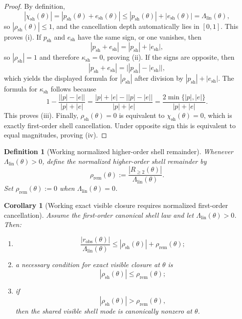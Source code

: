 \documentclass[12pt,a4paper]{article}
\newtheorem{corollary}[theorem]{Corollary}
\newtheorem{definition}[theorem]{Definition}
\begin{document}
\begin{proof}
By definition,
\[
 |\chi_{\mathrm{sh}}(\theta)|=|p_{\mathrm{sh}}(\theta)+e_{\mathrm{sh}}(\theta)|
 \le |p_{\mathrm{sh}}(\theta)|+|e_{\mathrm{sh}}(\theta)|
 =\Lambda_{\mathrm{lin}}(\theta),
\]
so $|\rho_{\mathrm{sh}}(\theta)|\le 1$, and the cancellation depth automatically lies in $[0,1]$. This proves (i). If $p_{\mathrm{sh}}$ and $e_{\mathrm{sh}}$ have the same sign, or one vanishes, then
\[
 |p_{\mathrm{sh}}+e_{\mathrm{sh}}|=|p_{\mathrm{sh}}|+|e_{\mathrm{sh}}|,
\]
so $|\rho_{\mathrm{sh}}|=1$ and therefore $\kappa_{\mathrm{sh}}=0$, proving (ii). If the signs are opposite, then
\[
 |p_{\mathrm{sh}}+e_{\mathrm{sh}}|=\bigl||p_{\mathrm{sh}}|-|e_{\mathrm{sh}}|\bigr|,
\]
which yields the displayed formula for $|\rho_{\mathrm{sh}}|$ after division by $|p_{\mathrm{sh}}|+|e_{\mathrm{sh}}|$. The formula for $\kappa_{\mathrm{sh}}$ follows because
\[
 1-\frac{\bigl||p|-|e|\bigr|}{|p|+|e|}=\frac{|p|+|e|-\bigl||p|-|e|\bigr|}{|p|+|e|}=\frac{2\min\{|p|,|e|\}}{|p|+|e|}.
\]
This proves (iii). Finally, $\rho_{\mathrm{sh}}(\theta)=0$ is equivalent to $\chi_{\mathrm{sh}}(\theta)=0$, which is exactly first-order shell cancellation. Under opposite sign this is equivalent to equal magnitudes, proving (iv).
\end{proof}

\begin{definition}[Working normalized higher-order shell remainder]
Whenever $\Lambda_{\mathrm{lin}}(\theta)>0$, define the normalized higher-order shell remainder by
\[
 \rho_{\mathrm{rem}}(\theta):=\frac{|R_{\ge 2}(\theta)|}{\Lambda_{\mathrm{lin}}(\theta)}.
\]
Set $\rho_{\mathrm{rem}}(\theta):=0$ when $\Lambda_{\mathrm{lin}}(\theta)=0$.
\end{definition}

\begin{corollary}[Working exact visible closure requires normalized first-order cancellation]
Assume the first-order canonical shell law and let $\Lambda_{\mathrm{lin}}(\theta)>0$. Then:
\begin{enumerate}[leftmargin=2em,label=(\roman*)]
\item
\[
 \frac{|r_{\mathrm{obs}}(\theta)|}{\Lambda_{\mathrm{lin}}(\theta)}
 \le |\rho_{\mathrm{sh}}(\theta)|+\rho_{\mathrm{rem}}(\theta);
\]
\item a necessary condition for exact visible closure at $\theta$ is
\[
 |\rho_{\mathrm{sh}}(\theta)|\le \rho_{\mathrm{rem}}(\theta);
\]
\item if
\[
 |\rho_{\mathrm{sh}}(\theta)|>\rho_{\mathrm{rem}}(\theta),
\]
then the shared visible shell mode is canonically nonzero at $\theta$.
\end{enumerate}
\end{corollary}
\end{document}
